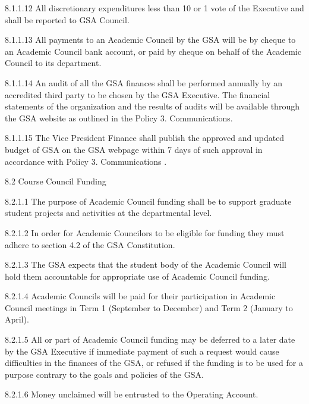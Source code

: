  8.1.1.12 All discretionary expenditures less than 10%
 or 1%
 vote of the Executive and shall be reported to GSA Council. 
 
 8.1.1.13 All payments to an Academic Council by the GSA will be by 
 cheque to an Academic Council bank account, or paid by cheque on 
 behalf of the Academic Council to its department. 
 
 8.1.1.14 An audit of all the GSA finances shall be performed annually 
 by an accredited third party to be chosen by the GSA Executive. The 
 financial statements of the organization and the results of audits will 
 be available through the GSA website as outlined in the Policy 3. 
 Communications. 
 
 8.1.1.15 The Vice President Finance shall publish the approved and 
 updated budget of GSA on the GSA webpage within 7 days of such 
 approval in accordance with Policy 3. Communications .
 
 8.2 Course Council Funding 
 
 8.2.1.1 The purpose of Academic Council funding shall be to support 
 graduate student projects and activities at the departmental level. 
 
 
 
 8.2.1.2 In order for Academic Councilors to be eligible for funding 
 they must adhere to section 4.2 of the GSA Constitution. 
 
 
 
 8.2.1.3 The GSA expects that the student body of the Academic 
 Council will hold them accountable for appropriate use of Academic 
 Council funding. 
 
 
 
 8.2.1.4 Academic Councils will be paid for their participation in 
 Academic Council meetings in Term 1 (September to December) and 
 Term 2 (January to April). 
 
 
 
 8.2.1.5 All or part of Academic Council funding may be deferred to a 
 later date by the GSA Executive if immediate payment of such a 
 request would cause difficulties in the finances of the GSA, or refused 
 if the funding is to be used for a purpose contrary to the goals and 
 policies of the GSA. 
 
 
 
 8.2.1.6 Money unclaimed will be entrusted to the Operating Account. 
 
 
 
